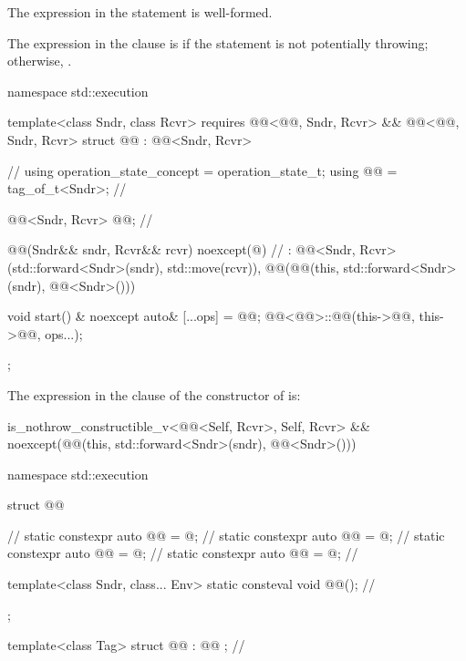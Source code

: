 \begin{itemdescr}
\pnum
\constraints
The expression in the  statement is well-formed.

\pnum
\remarks
The expression in the  clause is 
if the  statement is not potentially throwing;
otherwise, .
\end{itemdescr}

\pnum
\begin{codeblock}
namespace std::execution {
  template<class Sndr, class Rcvr>
    requires @@<@@, Sndr, Rcvr> &&
             @@<@@, Sndr, Rcvr>
  struct @@ : @@<Sndr, Rcvr> {            // \expos
    using operation_state_concept = operation_state_t;
    using @@ = tag_of_t<Sndr>;                               // \expos

    @@<Sndr, Rcvr> @@;                   // \expos

    @@(Sndr&& sndr, Rcvr&& rcvr) noexcept(@\seebelownc@)               // \expos
      : @@<Sndr, Rcvr>(std::forward<Sndr>(sndr), std::move(rcvr)),
        @@(@@(this, std::forward<Sndr>(sndr), @@<Sndr>()))
    {}

    void start() & noexcept {
      auto& [...ops] = @@;
      @@<@@>::@@(this->@@, this->@@, ops...);
    }
  };
}
\end{codeblock}

\pnum
The expression in the  clause of
the constructor of  is:
\begin{codeblock}
is_nothrow_constructible_v<@@<Self, Rcvr>, Self, Rcvr> &&
noexcept(@@(this, std::forward<Sndr>(sndr), @@<Sndr>()))
\end{codeblock}

\pnum
\begin{codeblock}
namespace std::execution {
  struct @@ {                                        // \expos
    static constexpr auto @@ = @\seebelownc@;                  // \expos
    static constexpr auto @@ = @\seebelownc@;                // \expos
    static constexpr auto @@ = @\seebelownc@;                    // \expos
    static constexpr auto @@ = @\seebelownc@;                 // \expos

    template<class Sndr, class... Env>
      static consteval void @@();                      // \expos
  };

  template<class Tag>
  struct @@ : @@ {};                          // \expos
}
\end{codeblock}

